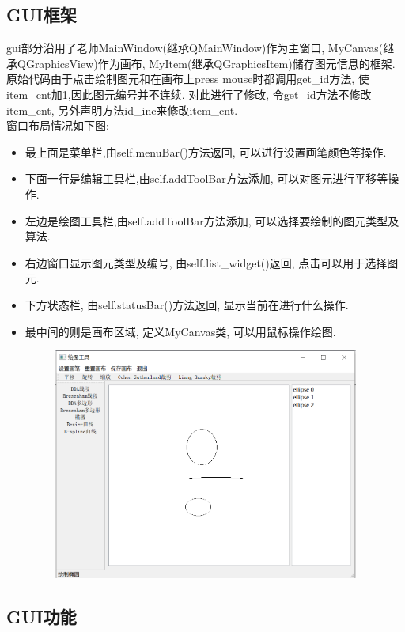 \documentclass[a4paper,UTF8]{article}
\theoremstyle{definition}
\begin{document}
\subsection{GUI框架}
gui部分沿用了老师MainWindow(继承QMainWindow)作为主窗口, MyCanvas(继承QGraphicsView)作为画布, MyItem(继承QGraphicsItem)储存图元信息的框架.\\
\indent 原始代码由于点击绘制图元和在画布上press mouse时都调用get\_id方法, 使item\_cnt加1,因此图元编号并不连续. 对此进行了修改, 令get\_id方法不修改item\_cnt, 另外声明方法id\_inc来修改item\_cnt.\\
\indent 窗口布局情况如下图:
\begin{itemize}
	\item 最上面是菜单栏,由self.menuBar()方法返回, 可以进行设置画笔颜色等操作.
	\item 下面一行是编辑工具栏,由self.addToolBar方法添加, 可以对图元进行平移等操作.
	\item 左边是绘图工具栏,由self.addToolBar方法添加, 可以选择要绘制的图元类型及算法.
	\item 右边窗口显示图元类型及编号, 由self.list\_widget()返回, 点击可以用于选择图元.
	\item 下方状态栏, 由self.statusBar()方法返回, 显示当前在进行什么操作.
	\item 最中间的则是画布区域, 定义MyCanvas类, 可以用鼠标操作绘图.
\end{itemize}
\begin{figure}[H]
	\includegraphics[width=5in,height=3in]{total.png}
\end{figure}
\subsection{GUI功能}
\end{document}
